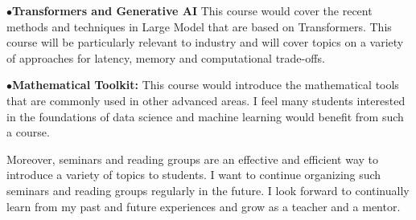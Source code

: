 \documentclass[11pt,a4paper,sans]{moderncv} %
\begin{document}
$\bullet{}$\textbf{Transformers and Generative AI} This course would cover the recent methods and techniques in Large Model that are based on Transformers. This course will be particularly relevant to industry and will cover topics on a variety of approaches for latency, memory and computational trade-offs.


$\bullet{}$\textbf{Mathematical Toolkit:}  This course would introduce the mathematical tools that are commonly used in other advanced areas. I feel many students interested in the foundations of data science and machine learning would benefit from such a course. \newline

Moreover, seminars and reading groups are an effective and efficient way to introduce a variety of topics to students. I want to continue organizing such seminars and reading groups regularly in the future. I look forward to continually learn from my past and future experiences and grow as a teacher and a mentor.
\end{document}
